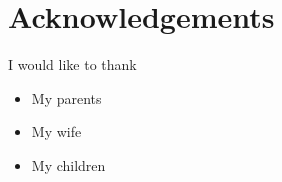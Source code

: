 \chapter*{Acknowledgements}



\newenvironment{acknowledgements}%
{\cleardoublepage\thispagestyle{empty}\null\vfill\begin{center}%
		\bfseries Acknowledgements\end{center}}%
{\vfill\null}

I would like to thank

\begin{itemize}
	\item My parents
	\item My wife 
	\item My children
\end{itemize}
